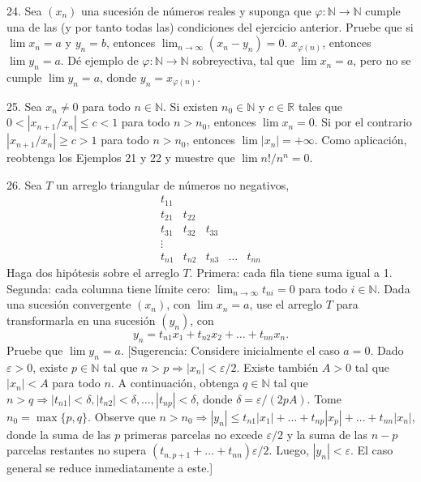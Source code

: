 \documentclass[12pt,oneside]{book}
\begin{document}
24. Sea \((x_n)\) una sucesión de números reales y suponga que \(\varphi: \mathbb{N} \to \mathbb{N}\) cumple una de las (y por tanto todas las) condiciones del ejercicio anterior. Pruebe que si \(\lim x_n = a\) y \(y_n = b\), entonces \(\lim_{n \to \infty} (x_n - y_n) = 0\). \(x_{\varphi(n)}\), entonces \(\lim y_n = a\). Dé ejemplo de \(\varphi: \mathbb{N} \to \mathbb{N}\) sobreyectiva, tal que \(\lim x_n = a\), pero no se cumple \(\lim y_n = a\), donde \(y_n = x_{\varphi(n)}\).

25. Sea \(x_n \neq 0\) para todo \(n \in \mathbb{N}\). Si existen \(n_0 \in \mathbb{N}\) y \(c \in \mathbb{R}\) tales que \(0 < |x_{n+1}/x_n| \leq c < 1\) para todo \(n > n_0\), entonces \(\lim x_n = 0\). Si por el contrario \(|x_{n+1}/x_n| \geq c > 1\) para todo \(n > n_0\), entonces \(\lim |x_n| = +\infty\). Como aplicación, reobtenga los Ejemplos 21 y 22 y muestre que \(\lim n! / n^n = 0\).

26. Sea \(T\) un arreglo triangular de números no negativos,
\[
\begin{array}{ccccc}
t_{11} & & & & \\
t_{21} & t_{22} & & & \\
t_{31} & t_{32} & t_{33} & & \\
\vdots & & & & \\
t_{n1} & t_{n2} & t_{n3} & \dots & t_{nn}
\end{array}
\]
Haga dos hipótesis sobre el arreglo \(T\). Primera: cada fila tiene suma igual a 1. Segunda: cada columna tiene límite cero: \(\lim_{n\to\infty} t_{ni} = 0\) para todo \(i \in \mathbb{N}\). Dada una sucesión convergente \((x_n)\), con \(\lim x_n = a\), use el arreglo \(T\) para transformarla en una sucesión \((y_n)\), con
\[
y_n = t_{n1}x_1 + t_{n2}x_2 + \dots + t_{nn}x_n.
\]
Pruebe que \(\lim y_n = a\).
[Sugerencia: Considere inicialmente el caso \(a = 0\). Dado \(\varepsilon > 0\), existe \(p \in \mathbb{N}\) tal que \(n > p \Rightarrow |x_n| < \varepsilon/2\). Existe también \(A > 0\) tal que \(|x_n| < A\) para todo \(n\). A continuación, obtenga \(q \in \mathbb{N}\) tal que \(n > q \Rightarrow |t_{n1}| < \delta, |t_{n2}| < \delta, \dots, |t_{np}| < \delta\), donde \(\delta = \varepsilon / (2pA)\). Tome \(n_0 = \max\{p, q\}\). Observe que \(n > n_0 \Rightarrow |y_n| \leq t_{n1}|x_1| + \dots + t_{np}|x_p| + \dots + t_{nn}|x_n|\), donde la suma de las \(p\) primeras parcelas no excede \(\varepsilon/2\) y la suma de las \(n-p\) parcelas restantes no supera \((t_{n,p+1} + \dots + t_{nn}) \varepsilon/2\). Luego, \(|y_n| < \varepsilon\). El caso general se reduce inmediatamente a este.]
\end{document}
